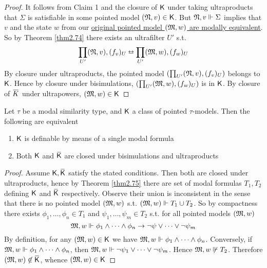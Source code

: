 \documentclass[11pt]{article}
\begin{document}
\begin{proof}
It follows from Claim 1 and the closure of \(\textsf{K}\) under taking
ultraproducts that \(\Sigma\) is satisfiable in some pointed model
\((\mathfrak{N},v)\in\textsf{K}\). But \(\mathfrak{N},v\Vdash\Sigma\) implies that \(v\) and the
state \(w\)  from our \uline{original pointed model \((\mathfrak{M},w)\) are modally
equivalent}. So by Theorem \ref{thm2.74} there exists an ultrafilter \(U'\)
s.t.
\begin{equation*}
\prod_{U'}(\mathfrak{N},v),(f_v)_U\leftrightarroweq
\prod_{U'}(\mathfrak{M},w),(f_w)_U
\end{equation*}
By closure under ultraproducts, the pointed model
\((\prod_{U'}(\mathfrak{N},v),(f_v)_U)\) belongs to \(\textsf{K}\). Hence by closure under
bisimulations, \((\prod_{U'}(\mathfrak{M},w),(f_w)_U)\) is in \(\textsf{K}\). By closure
of \(\bbar{K}\) under ultrapowers, \((\mathfrak{M},w)\in\textsf{K}\)
\end{proof}

\begin{theorem}[]
\label{thm2.76}
Let \(\tau\) be a modal similarity type, and \(\textsf{K}\) a class of pointed
\(\tau\)-models. Then the following are equivalent
\begin{enumerate}
\item \(\textsf{K}\) is definable by means of a single modal formula
\item Both \(\textsf{K}\) and \(\bbar{\sfK}\) are closed under bisimulations and ultraproducts
\end{enumerate}
\end{theorem}

\begin{proof}
Assume \(\sfK,\bbar{\sfK}\) satisfy the stated conditions. Then both are
closed under ultraproducts, hence by Theorem \ref{thm2.75} there are set of
modal formulas \(T_1,T_2\) defining \(\textsf{K}\) and \(\bbar{\sfK}\)
respectively. Observe their union is inconsistent in the sense that there is
no pointed model \((\mathfrak{M},w)\) s.t. \((\mathfrak{M},w)\Vdash T_1\cup T_2\). So by
compactness there exists \(\phi_1,\dots,\phi_n\in T_1\) and
\(\psi_1,\dots,\psi_m\in T_2\) s.t. for all pointed models \((\mathfrak{M},w)\)
\begin{equation*}
\mathfrak{M},w\Vdash\phi_1\wedge\dots\wedge\phi_n\to\neg\psi\vee\dots\vee\neg\psi_m
\end{equation*}
By definition, for any \((\mathfrak{M},w)\in\textsf{K}\) we have
\(\mathfrak{M},w\Vdash\phi_1\wedge\dots\wedge\phi_n\). Conversely, if
\(\mathfrak{M},w\Vdash\phi_1\wedge\dots\wedge\phi_n\), then
\(\mathfrak{M},w\Vdash\neg\psi_1\vee\dots\vee\neg\psi_m\). Hence \(\mathfrak{M},w\not\Vdash
    T_2\). Therefore \((\fM,w)\not\in\bbar{\sfK}\), whence \((\mathfrak{M},w)\in\textsf{K}\)
\end{proof}
\end{document}
